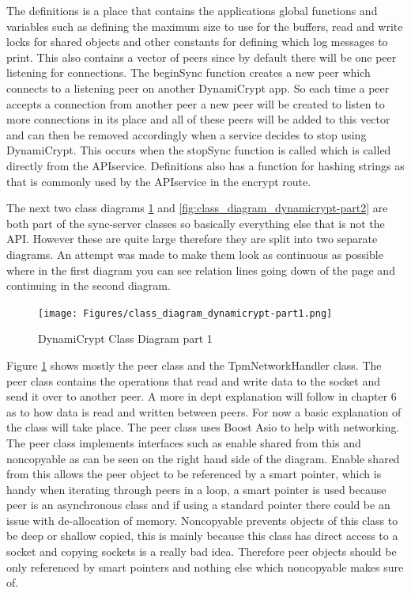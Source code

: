 The definitions is a place that contains the applications global functions and variables such as defining the maximum size to use for the buffers, read and write locks for shared objects and other constants for defining which log messages to print. This also contains a vector of peers since by default there will be one peer listening for connections. The beginSync function creates a new peer which connects to a listening peer on another DynamiCrypt app. So each time a peer accepts a connection from another peer a new peer will be created to listen to more connections in its place and all of these peers will be added to this vector and can then be removed accordingly when a service decides to stop using DynamiCrypt. This occurs when the stopSync function is called which is called directly from the APIservice. Definitions also has a function for hashing strings as that is commonly used by the APIservice in the encrypt route.

The next two class diagrams \ref{fig:class_diagram_dynamicrypt-part1} and \ref{fig:class_diagram_dynamicrypt-part2} are both part of the sync-server classes so basically everything else that is not the API. However these are quite large therefore they are split into two separate diagrams. An attempt was made to make them look as continuous as possible where in the first diagram you can see relation lines going down of the page and continuing in the second diagram.

\begin{figure}[!h]
  \centering
      \texttt{[image: Figures/class\_diagram\_dynamicrypt-part1.png]}
  \caption[DynamiCrypt Class Diagram part 1]{DynamiCrypt Class Diagram part 1}
  \label{fig:class_diagram_dynamicrypt-part1}
\end{figure}
\FloatBarrier

Figure \ref{fig:class_diagram_dynamicrypt-part1} shows mostly the peer class and the TpmNetworkHandler class. The peer class contains the operations that read and write data to the socket and send it over to another peer. A more in dept explanation will follow in chapter 6 as to how data is read and written between peers. For now a basic explanation of the class will take place. The peer class uses Boost Asio to help with networking. The peer class implements interfaces such as enable shared from this and noncopyable as can be seen on the right hand side of the diagram.  Enable shared from this allows the peer object to be referenced by a smart pointer, which is handy when iterating through peers in a loop, a smart pointer is used because peer is an asynchronous class and if using a standard pointer there could be an issue with de-allocation of memory.  Noncopyable prevents objects of this class to be deep or shallow copied, this is mainly because this class has direct access to a socket and copying sockets is a really bad idea. Therefore peer objects should be only referenced by smart pointers and nothing else which noncopyable makes sure of.

